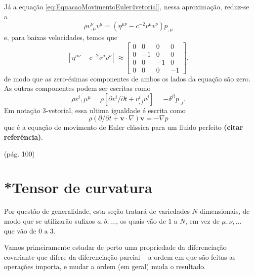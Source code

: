 Já a equação \eqref{eq:EquacaoMovimentoEuler4vetorial}, nessa aproximação, reduz-se a 
\[
	\rho v_{, \mu}^{\nu} v^{\mu}=\left(\eta^{\mu \nu}-c^{-2} v^{\mu} v^{\nu}\right) p_{, \mu}
\]
e, para baixas velocidades, temos que
\[
\left[\eta^{\mu \nu}-c^{-2} v^{\mu} v^{\nu}\right] \approx
\left[\begin{array}{rrrr}{0} & {0} & {0} & {0} \\ {0} & {-1} & {0} & {0} \\ {0} & {0} & {-1} & {0} \\ {0} & {0} & {0} & {-1}\end{array}\right],
\]
de modo que as zero-ésimas componentes de ambos os lados da equação são zero. As outras componentes podem ser escritas como
\[
	\rho v^{i}, \mu^{\mu}= \rho\left[\partial v^{i} / \partial t+v_{, j}^{i} v^{j}\right]=-\delta^{j i} p_{, j} .\]
Em notação 3-vetorial, essa ultima igualdade é escrita como
\begin{equation}\label{eq:EquacaoMovimentoEulerClassica3vetorial}
	\boxed{
		\rho(\partial / \partial t+\mathbf{v} \cdot \nabla) \mathbf{v}=-\nabla p
	}
\end{equation}
que é a equação de movimento de Euler clássica para um fluido perfeito \textbf{(citar referência)}.

(pág. 100)




















\section{*Tensor de curvatura}\label{sec:TensorCurvatura}

Por questão de generalidade, esta seção tratará de variedades $N$-dimensionais, de modo que se utilizarão sufixos $a,b,\dots$, os quais vão de $1$ a $N$, em vez de $\mu,\nu,\dots$ que vão de $0$ a $3$. 

Vamos primeiramente estudar de perto uma propriedade da diferenciação covariante que difere da diferenciação parcial -- a ordem em que são feitas as operações importa, e mudar a ordem (em geral) muda o resultado.

